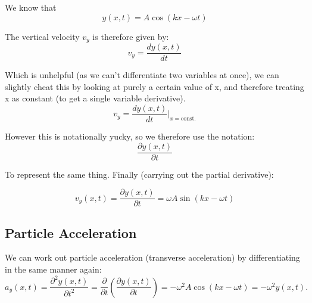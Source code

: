 We know that
\[
    y(x, t) = A \cos(kx - \omega t)
\]

The vertical velocity $v_y$ is therefore given by:
\[
    v_y = \frac{dy(x, t)}{dt}
\]

Which is unhelpful (as we can't differentiate two variables at once), we can slightly cheat this by looking at purely a certain value of x, and therefore treating x as constant (to get a single variable derivative).
\[
    v_y = \frac{dy(x, t)}{dt} \Bigr\rvert_{x = \text{const.}}
\]


However this is notationally yucky, so we therefore use the notation:
\[
    \frac{\partial y(x, t)}{\partial t}
\]

To represent the same thing. Finally (carrying out the partial derivative):

\[
  v_y(x, t) = \frac{\partial y(x, t)}{\partial t} = \omega A \sin(kx - \omega t)
\]

\subsection*{Particle Acceleration}
We can work out particle acceleration (transverse acceleration) by differentiating in the same manner again:
\[
    a_y(x, t) = \frac{\partial^2 y(x, t)}{\partial t^2} = \frac{\partial}{\partial t} \left(\frac{\partial y(x, t)}{\partial t} \right) = - \omega^2 A \cos(kx - \omega t) = -\omega^2 y(x, t).
\]


